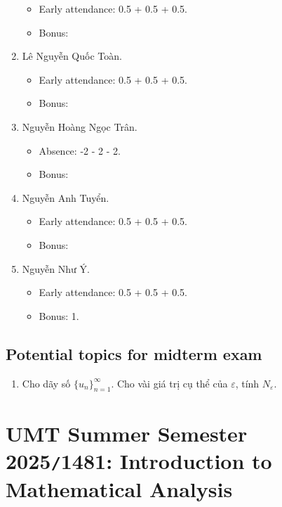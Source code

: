 \documentclass{article}
\begin{document}
\begin{enumerate}
	\begin{itemize}
		\item Early attendance: 0.5 + 0.5 + 0.5.
		\item Bonus: 
	\end{itemize}
	\item {\sc Lê Nguyễn Quốc Toàn.}
	\begin{itemize}
		\item Early attendance: 0.5 + 0.5 + 0.5.
		\item Bonus: 
	\end{itemize}
	\item {\sc Nguyễn Hoàng Ngọc Trân.}
	\begin{itemize}
		\item Absence: -2 - 2 - 2.
		\item Bonus: 
	\end{itemize}
	\item {\sc Nguyễn Anh Tuyển.}
	\begin{itemize}
		\item Early attendance: 0.5 + 0.5 + 0.5.
		\item Bonus: 
	\end{itemize}
	\item {\sc Nguyễn Như Ý.}
	\begin{itemize}
		\item Early attendance: 0.5 + 0.5 + 0.5.
		\item Bonus: 1.
	\end{itemize}
\end{enumerate}


\subsection{Potential topics for midterm exam}

\begin{enumerate}
	\item Cho dãy số $\{u_n\}_{n=1}^\infty$. Cho vài giá trị cụ thể của $\varepsilon$, tính $N_\varepsilon$.
\end{enumerate}


\section{UMT Summer Semester 2025{\tt/}1481: Introduction to Mathematical Analysis}
\end{document}
